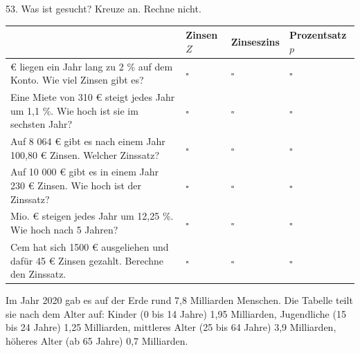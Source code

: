 \documentclass[11pt]{article}
\begin{document}
\par\Needspace*{0.55\textheight}
\begin{pfaufg}{}{53.}{}
Was ist gesucht? Kreuze an. Rechne nicht.
\par\smallskip\noindent \begingroup\renewcommand{\arraystretch}{1.4}\begin{tabular}{|>{\raggedright\arraybackslash}p{6.3cm}|>{\centering\arraybackslash\hyphenpenalty=0}p{1.55cm}|>{\centering\arraybackslash\hyphenpenalty=0}p{1.55cm}|>{\centering\arraybackslash\hyphenpenalty=0}p{1.55cm}|}\hline  & {\scriptsize\hspace{0pt}Zinsen $Z$} & {\scriptsize\hspace{0pt}Zinseszins} & {\scriptsize\hspace{0pt}Prozentsatz $p$} \\ \hline 400 € liegen ein Jahr lang zu 2 \% auf dem Konto. Wie viel Zinsen gibt es? & $\square$ & $\square$ & $\square$ \\ \hline Eine Miete von 310 € steigt jedes Jahr um 1,1 \%. Wie hoch ist sie im sechsten Jahr? & $\square$ & $\square$ & $\square$ \\ \hline Auf 8 064 € gibt es nach einem Jahr 100,80 € Zinsen. Welcher Zinssatz? & $\square$ & $\square$ & $\square$ \\ \hline Auf 10 000 € gibt es in einem Jahr 230 € Zinsen. Wie hoch ist der Zinssatz? & $\square$ & $\square$ & $\square$ \\ \hline 614 Mio. € steigen jedes Jahr um 12,25 \%. Wie hoch nach 5 Jahren? & $\square$ & $\square$ & $\square$ \\ \hline Cem hat sich 1500 € ausgeliehen und dafür 45 € Zinsen gezahlt. Berechne den Zinssatz. & $\square$ & $\square$ & $\square$ \\ \hline\end{tabular}\endgroup\par
\end{pfaufg}
\begin{pfaufg}{}{}{}
Im Jahr 2020 gab es auf der Erde rund 7,8 Milliarden Menschen. Die Tabelle teilt sie nach dem Alter auf: Kinder (0 bis 14 Jahre) 1,95 Milliarden, Jugendliche (15 bis 24 Jahre) 1,25 Milliarden, mittleres Alter (25 bis 64 Jahre) 3,9 Milliarden, höheres Alter (ab 65 Jahre) 0,7 Milliarden.
\par\smallskip\noindent {}\par
\end{pfaufg}
\end{document}
